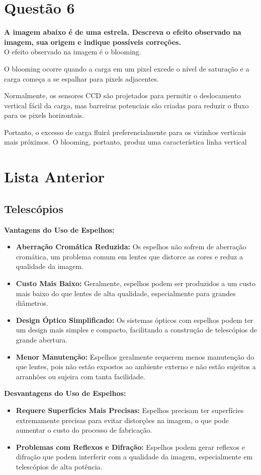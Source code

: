 \documentclass[a4paper, 12pt]{article}
\begin{document}
\section*{Questão 6}
\noindent \textbf{A imagem abaixo é de uma estrela. Descreva o efeito observado na imagem, sua origem e indique possíveis correções.} \\


O efeito observado na imagem é o blooming.

O blooming ocorre quando a carga em um pixel excede o nível de saturação e a carga começa a se espalhar para pixels adjacentes.

Normalmente, os sensores CCD são projetados para permitir o deslocamento vertical fácil da carga, mas barreiras potenciais são criadas para reduzir o fluxo para os pixels horizontais.

Portanto, o excesso de carga fluirá preferencialmente para os vizinhos verticais mais próximos. O blooming, portanto, produz uma característica linha vertical


\section*{Lista Anterior}
\subsection{Telescópios}
\textbf{Vantagens do Uso de Espelhos:}
\begin{itemize}
    \item \textbf{Aberração Cromática Reduzida:} Os espelhos não sofrem de aberração cromática, um problema comum em lentes que distorce as cores e reduz a qualidade da imagem.
    \item \textbf{Custo Mais Baixo:} Geralmente, espelhos podem ser produzidos a um custo mais baixo do que lentes de alta qualidade, especialmente para grandes diâmetros.
    \item \textbf{Design Óptico Simplificado:} Os sistemas ópticos com espelhos podem ter um design mais simples e compacto, facilitando a construção de telescópios de grande abertura.
    \item \textbf{Menor Manutenção:} Espelhos geralmente requerem menos manutenção do que lentes, pois não estão expostos ao ambiente externo e não estão sujeitos a arranhões ou sujeira com tanta facilidade.
\end{itemize}

\textbf{Desvantagens do Uso de Espelhos:}
\begin{itemize}
    \item \textbf{Requere Superfícies Mais Precisas:} Espelhos precisam ter superfícies extremamente precisas para evitar distorções na imagem, o que pode aumentar o custo do processo de fabricação.
    \item \textbf{Problemas com Reflexos e Difração:} Espelhos podem gerar reflexos e difração que podem interferir com a qualidade da imagem, especialmente em telescópios de alta potência.
\end{itemize}
\end{document}
